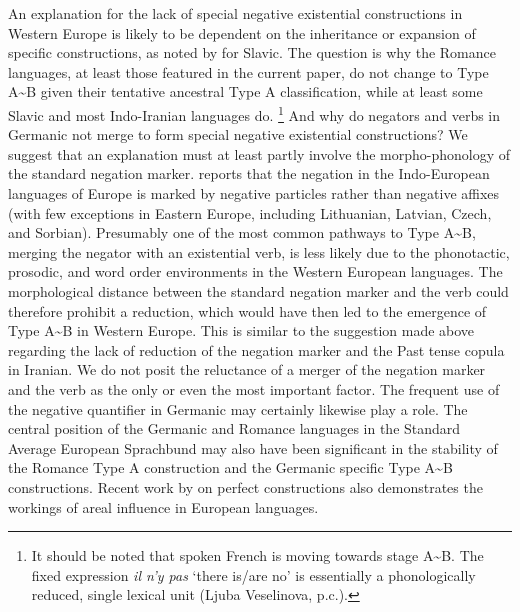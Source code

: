 \documentclass[output=paper,colorlinks,citecolor=brown]{langscibook}
\begin{document}
An explanation for the lack of special negative existential constructions
in Western Europe is likely to be dependent on the inheritance or expansion
of specific constructions, as noted by \citet[1330]{Veselinova2014} for
Slavic. The question is why the Romance languages, at least those featured
in the current paper, do not change to Type A{\textasciitilde}B given their
tentative ancestral Type A classification, while at least some Slavic and
most Indo-Iranian languages do.%
%
\footnote{It should be noted that spoken French is moving towards stage
A{\textasciitilde}B. The fixed expression \textit{il n’y
pas} `there is\slash are no' is essentially a phonologically reduced,
single lexical unit (Ljuba Veselinova, p.c.).} 
%
And why do negators and verbs in Germanic not merge to form special
negative existential constructions? We suggest that an explanation must at
least partly involve the morpho-phonology of the standard negation marker.
\citet{Dryer2013} reports that the negation in the Indo-European languages
of Europe is marked by negative particles rather than negative affixes
(with few exceptions in Eastern Europe, including Lithuanian, Latvian,
Czech, and Sorbian). Presumably one of the most common pathways to Type
A{\textasciitilde}B, merging the negator with an existential verb, is less
likely due to the phonotactic, prosodic, and word order environments in the
Western European languages. The morphological distance between the standard
negation marker and the verb could therefore prohibit a reduction, which
would have then led to the emergence of Type A{\textasciitilde}B in Western
Europe. This is similar to the suggestion made above regarding the lack of
reduction of the negation marker and the Past tense copula in Iranian. We
do not posit the reluctance of a merger of the negation marker and the verb
as the only or even the most important factor. The frequent use of the
negative quantifier in Germanic may certainly likewise play a role. The
central position of the Germanic and Romance languages in the Standard
Average European Sprachbund \parencite{Auwera2011} may also have been significant in the stability of the Romance Type A construction and the Germanic specific Type A{\textasciitilde}B constructions. Recent work by \citet{Drinka2017} on perfect constructions also demonstrates the workings of areal influence in European languages.  
\end{document}
